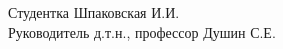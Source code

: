 \vspace{0.5cm}

\begin{flushleft}
	Студентка \hspace{6cm} \underline{\hspace{3cm}} \hspace{1cm}  Шпаковская И.И. \\ 
	\vspace{5mm}
	Руководитель \hspace{0,5cm} д.т.н., профессор \hspace{1cm} \underline{\hspace{3cm}}\hspace{1cm}  Душин С.Е.\\ 
\end{flushleft}

\thispagestyle{empty} %